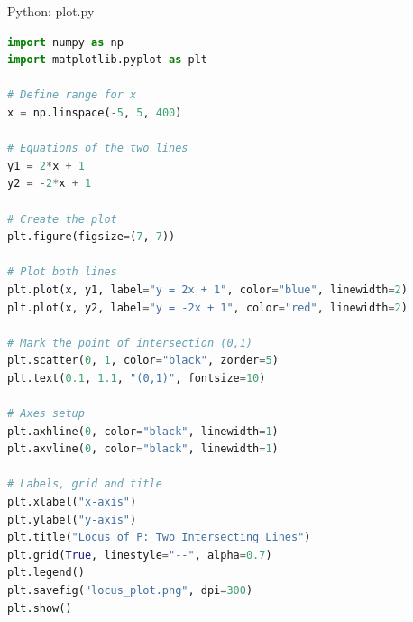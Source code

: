\documentclass{beamer}
\numberwithin{equation}{section}
\theoremstyle{remark}
\begin{document}
\begin{frame}[fragile]{Python: plot.py}
\begin{lstlisting}[language=Python]
 import numpy as np
import matplotlib.pyplot as plt

# Define range for x
x = np.linspace(-5, 5, 400)

# Equations of the two lines
y1 = 2*x + 1
y2 = -2*x + 1

# Create the plot
plt.figure(figsize=(7, 7))

# Plot both lines
plt.plot(x, y1, label="y = 2x + 1", color="blue", linewidth=2)
plt.plot(x, y2, label="y = -2x + 1", color="red", linewidth=2)

# Mark the point of intersection (0,1)
plt.scatter(0, 1, color="black", zorder=5)
plt.text(0.1, 1.1, "(0,1)", fontsize=10)

# Axes setup
plt.axhline(0, color="black", linewidth=1)
plt.axvline(0, color="black", linewidth=1)

# Labels, grid and title
plt.xlabel("x-axis")
plt.ylabel("y-axis")
plt.title("Locus of P: Two Intersecting Lines")
plt.grid(True, linestyle="--", alpha=0.7)
plt.legend()
plt.savefig("locus_plot.png", dpi=300)
plt.show()

\end{lstlisting}
\end{frame} 
\end{document}
